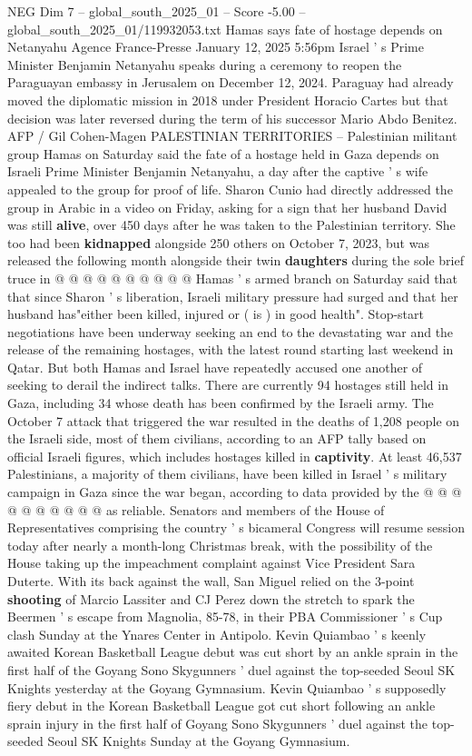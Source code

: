 \begin{textsample}{NEG Dim 7 – global\_south\_2025\_01 – Score -5.00 – global\_south\_2025\_01/119932053.txt}  \label{ex:f7_neg_200}
Hamas says fate of hostage depends on Netanyahu Agence France-Presse January 12, 2025 5:56pm Israel ' s Prime Minister Benjamin Netanyahu speaks during a ceremony to reopen the Paraguayan embassy in Jerusalem on December 12, 2024.
Paraguay had already moved the diplomatic mission in 2018 under President Horacio Cartes but that decision was later reversed during the term of his successor Mario Abdo Benitez.
AFP / Gil Cohen-Magen PALESTINIAN TERRITORIES -- Palestinian militant group Hamas on Saturday said the fate of a hostage held in Gaza depends on Israeli Prime Minister Benjamin Netanyahu, a day after the captive ' s wife appealed to the group for proof of life.
Sharon Cunio had directly addressed the group in Arabic in a video on Friday, asking for a sign that her husband David was still \textbf{alive}, over 450 days after he was taken to the Palestinian territory.
She too had been \textbf{kidnapped} alongside 250 others on October 7, 2023, but was released the following month alongside their twin \textbf{daughters} during the sole brief truce in @ @ @ @ @ @ @ @ @ @ Hamas ' s armed branch on Saturday said that that since Sharon ' s liberation, Israeli military pressure had surged and that her husband has"either been killed, injured or ( is ) in good health".
Stop-start negotiations have been underway seeking an end to the devastating war and the release of the remaining hostages, with the latest round starting last weekend in Qatar.
But both Hamas and Israel have repeatedly accused one another of seeking to derail the indirect talks.
There are currently 94 hostages still held in Gaza, including 34 whose death has been confirmed by the Israeli army.
The October 7 attack that triggered the war resulted in the deaths of 1,208 people on the Israeli side, most of them civilians, according to an AFP tally based on official Israeli figures, which includes hostages killed in \textbf{captivity}.
At least 46,537 Palestinians, a majority of them civilians, have been killed in Israel ' s military campaign in Gaza since the war began, according to data provided by the @ @ @ @ @ @ @ @ @ @ as reliable.
Senators and members of the House of Representatives comprising the country ' s bicameral Congress will resume session today after nearly a month-long Christmas break, with the possibility of the House taking up the impeachment complaint against Vice President Sara Duterte.
With its back against the wall, San Miguel relied on the 3-point \textbf{shooting} of Marcio Lassiter and CJ Perez down the stretch to spark the Beermen ' s escape from Magnolia, 85-78, in their PBA Commissioner ' s Cup clash Sunday at the Ynares Center in Antipolo.
Kevin Quiambao ' s keenly awaited Korean Basketball League debut was cut short by an ankle sprain in the first half of the Goyang Sono Skygunners ' duel against the top-seeded Seoul SK Knights yesterday at the Goyang Gymnasium.
Kevin Quiambao ' s supposedly fiery debut in the Korean Basketball League got cut short following an ankle sprain injury in the first half of Goyang Sono Skygunners ' duel against the top-seeded Seoul SK Knights Sunday at the Goyang Gymnasium.

\end{textsample}
